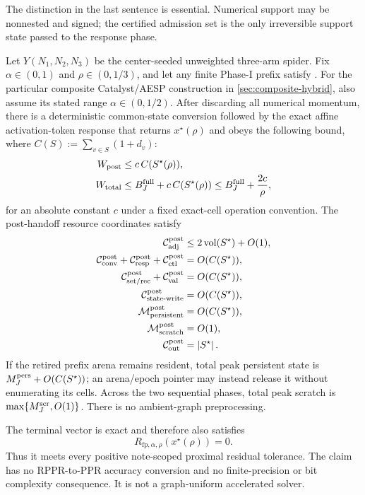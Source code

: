 The distinction in the last sentence is essential. Numerical support may be
nonnested and signed; the certified admission set is the only irreversible
support state passed to the response phase.

\begin{theorem}
\label{thm:three-arm-composite-response-handoff}
Let $Y(N_1,N_2,N_3)$ be the center-seeded unweighted three-arm spider. Fix
$\alpha\in(0,1)$ and $\rho\in(0,1/3)$, and let any finite Phase-I prefix
satisfy . For the particular
composite Catalyst/AESP construction in \cref{sec:composite-hybrid}, also
assume its stated range $\alpha\in(0,1/2)$. After discarding all numerical
momentum, there is a deterministic common-state conversion followed by the
exact affine activation-token response that returns $x^\star(\rho)$ and obeys
the following bound, where
$C(S):=\sum_{v\in S}(1+d_v)$:
\begin{align}
 W_{\rm post}
 &\leq c\,C(S^\star(\rho)),
 \notag\\
 W_{\rm total}
 &\leq B_J^{\rm full}+c\,C(S^\star(\rho))
 \leq B_J^{\rm full}+\frac{2c}{\rho},
 \label{eq:three-arm-composite-work}
\end{align}
for an absolute constant $c$ under a fixed exact-cell operation convention.
The post-handoff resource coordinates satisfy
\begin{align}
 \mathcal C_{\rm adj}^{\rm post}
   &\leq 2\operatorname{vol}(S^\star)+O(1),
 \notag\\
 \mathcal C_{\rm conv}^{\rm post}
   +\mathcal C_{\rm resp}^{\rm post}
   +\mathcal C_{\rm ctl}^{\rm post}
   &=O(C(S^\star)),
 \notag\\
 \mathcal C_{\rm set/rec}^{\rm post}
   +\mathcal C_{\rm val}^{\rm post}
   &=O(C(S^\star)),
 \notag\\
 \mathcal C_{\rm state\text{-}write}^{\rm post}
   &=O(C(S^\star)),
 \notag\\
 \mathcal M_{\rm persistent}^{\rm post}
   &=O(C(S^\star)),
 \notag\\
 \mathcal M_{\rm scratch}^{\rm post}
   &=O(1),
 \notag\\
 \mathcal C_{\rm out}^{\rm post}
   &=\left\lvert S^\star \right\rvert.
 \label{eq:three-arm-composite-resources}
\end{align}
If the retired prefix arena remains resident, total peak persistent state is
$M_J^{\rm pers}+O(C(S^\star))$; an arena/epoch pointer may instead release it
without enumerating its cells. Across the two sequential phases, total peak
scratch is $\max\{M_J^{\rm scr},O(1)\}$. There is no ambient-graph
preprocessing.

The terminal vector is exact and therefore also satisfies
\begin{equation}
 R_{\mathrm{fp},\alpha,\rho}(x^\star(\rho))=0.
 \label{eq:three-arm-terminal-proximal}
\end{equation}
Thus it meets every positive note-scoped proximal residual tolerance. The
claim has no RPPR-to-PPR accuracy conversion and no finite-precision or bit
complexity consequence. It is not a graph-uniform accelerated solver.
\end{theorem}


